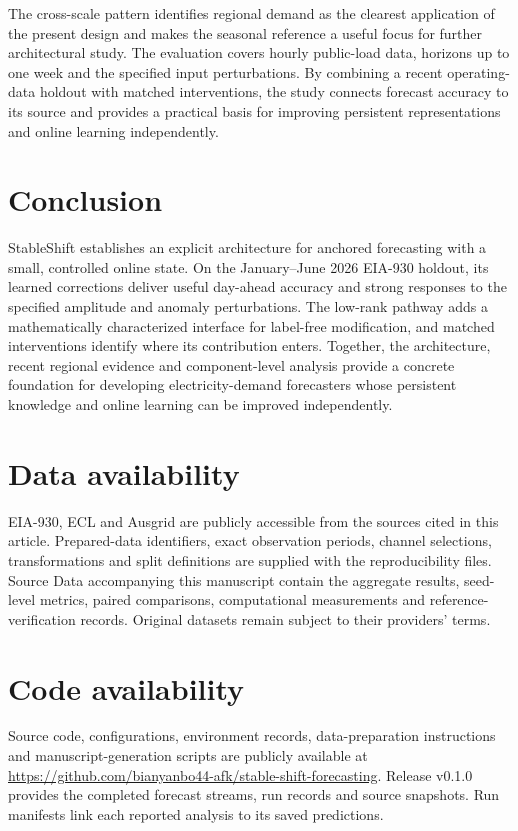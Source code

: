 \documentclass[final,5p,times]{elsarticle}
\begin{document}
The cross-scale pattern identifies regional demand as the clearest application of the present design and makes the seasonal reference a useful focus for further architectural study. The evaluation covers hourly public-load data, horizons up to one week and the specified input perturbations. By combining a recent operating-data holdout with matched interventions, the study connects forecast accuracy to its source and provides a practical basis for improving persistent representations and online learning independently.

\section{Conclusion}
StableShift establishes an explicit architecture for anchored forecasting with a small, controlled online state. On the January--June 2026 EIA-930 holdout, its learned corrections deliver useful day-ahead accuracy and strong responses to the specified amplitude and anomaly perturbations. The low-rank pathway adds a mathematically characterized interface for label-free modification, and matched interventions identify where its contribution enters. Together, the architecture, recent regional evidence and component-level analysis provide a concrete foundation for developing electricity-demand forecasters whose persistent knowledge and online learning can be improved independently.

\section*{Data availability}
EIA-930, ECL and Ausgrid are publicly accessible from the sources cited in this article. Prepared-data identifiers, exact observation periods, channel selections, transformations and split definitions are supplied with the reproducibility files. Source Data accompanying this manuscript contain the aggregate results, seed-level metrics, paired comparisons, computational measurements and reference-verification records. Original datasets remain subject to their providers' terms.

\section*{Code availability}
Source code, configurations, environment records, data-preparation instructions and manuscript-generation scripts are publicly available at \url{https://github.com/bianyanbo44-afk/stable-shift-forecasting}. Release v0.1.0 provides the completed forecast streams, run records and source snapshots. Run manifests link each reported analysis to its saved predictions.
\end{document}
